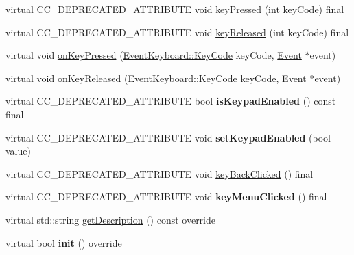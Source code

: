 \begin{DoxyCompactItemize}
virtual C\+C\+\_\+\+D\+E\+P\+R\+E\+C\+A\+T\+E\+D\+\_\+\+A\+T\+T\+R\+I\+B\+U\+TE void \hyperlink{classLayer_a8f3ccce82635e42a9c01346bdfa163ec}{key\+Pressed} (int key\+Code) final
\item 
virtual C\+C\+\_\+\+D\+E\+P\+R\+E\+C\+A\+T\+E\+D\+\_\+\+A\+T\+T\+R\+I\+B\+U\+TE void \hyperlink{classLayer_acf527c64c7817cffc979507b4888d71a}{key\+Released} (int key\+Code) final
\item 
virtual void \hyperlink{classLayer_aa92de73700bdffa7e30a37cac4ea6e98}{on\+Key\+Pressed} (\hyperlink{classEventKeyboard_a7cd3fa46515673276ce8ec7f0e051606}{Event\+Keyboard\+::\+Key\+Code} key\+Code, \hyperlink{classEvent}{Event} $\ast$event)
\item 
virtual void \hyperlink{classLayer_a5d382621487e2df6726084535071daca}{on\+Key\+Released} (\hyperlink{classEventKeyboard_a7cd3fa46515673276ce8ec7f0e051606}{Event\+Keyboard\+::\+Key\+Code} key\+Code, \hyperlink{classEvent}{Event} $\ast$event)
\item 
\mbox{\label{classLayer_a3739dde26584085e331444f4da5ef60b}} 
virtual C\+C\+\_\+\+D\+E\+P\+R\+E\+C\+A\+T\+E\+D\+\_\+\+A\+T\+T\+R\+I\+B\+U\+TE bool {\bfseries is\+Keypad\+Enabled} () const final
\item 
\mbox{\label{classLayer_a62615d286fd150ec967d76f784ad6d2b}} 
virtual C\+C\+\_\+\+D\+E\+P\+R\+E\+C\+A\+T\+E\+D\+\_\+\+A\+T\+T\+R\+I\+B\+U\+TE void {\bfseries set\+Keypad\+Enabled} (bool value)
\item 
virtual C\+C\+\_\+\+D\+E\+P\+R\+E\+C\+A\+T\+E\+D\+\_\+\+A\+T\+T\+R\+I\+B\+U\+TE void \hyperlink{classLayer_aea2ec8f77681b4fd1c988bbeeb3d1c22}{key\+Back\+Clicked} () final
\item 
\mbox{\label{classLayer_a42d14eb2fd8bd090562f9144e5a770bc}} 
virtual C\+C\+\_\+\+D\+E\+P\+R\+E\+C\+A\+T\+E\+D\+\_\+\+A\+T\+T\+R\+I\+B\+U\+TE void {\bfseries key\+Menu\+Clicked} () final
\item 
virtual std\+::string \hyperlink{classLayer_acadcdf383e0bf892c95213a4f7725672}{get\+Description} () const override
\item 
\mbox{\label{classLayer_a3d81bbeec30969c2c94b217c8d3f0692}} 
virtual bool {\bfseries init} () override
\item 
\mbox{\label{classLayer_a697a803ad49ae16aa869972d80757d15}} 

\end{DoxyCompactItemize}
